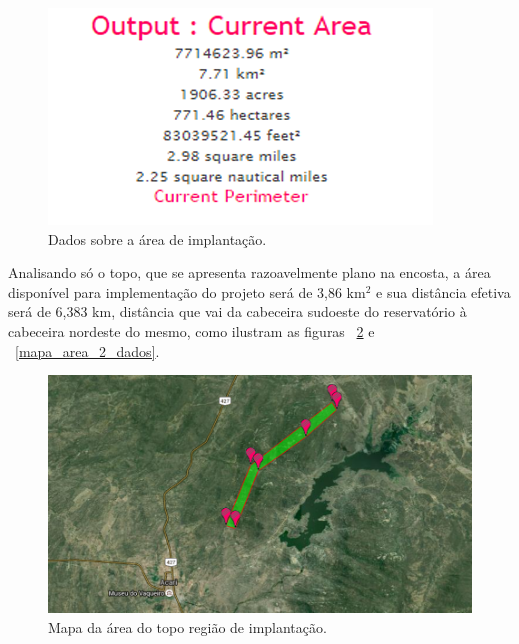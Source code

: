     \begin{figure}[h]
    \begin{center}
      \includegraphics[scale=0.6]{editaveis/figuras/mapa_area_1_dados}
      \caption[Dados sobre a área de implantação]{Dados sobre a área de implantação. \footnotemark}
      \label{mapa_area_1_dados}
    \end{center}
    \end{figure}
    \FloatBarrier
    
    Analisando só o topo, que se apresenta razoavelmente plano na encosta, a área disponível para implementação do projeto será de
    3,86 km$^2$ e sua distância efetiva será de 6,383 km, distância que vai da cabeceira sudoeste do reservatório à cabeceira nordeste
    do mesmo, como ilustram as figuras ~\ref{mapa_area_2} e ~\ref{mapa_area_2_dados}.
    
    \begin{figure}[h]
    \begin{center}
      \includegraphics[scale=0.5]{editaveis/figuras/mapa_area_2}
      \caption[Mapa da área do topo da região de implantação]{Mapa da área do topo região de implantação. \footnotemark}
      \label{mapa_area_2}
    \end{center}
    \end{figure}
    \FloatBarrier
    
